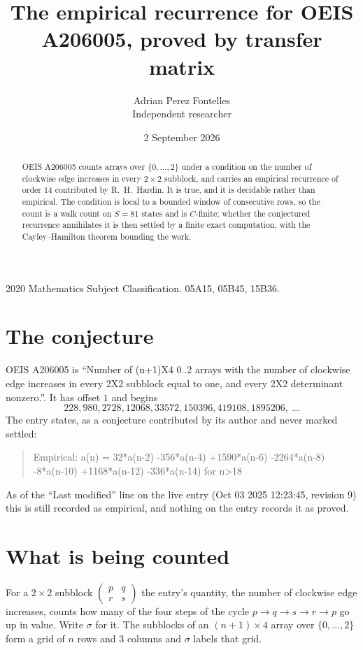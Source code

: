 \documentclass[11pt,a4paper]{article}
\title{The empirical recurrence for OEIS A206005, proved by transfer matrix}
\author{Adrian Perez Fontelles\\ \small Independent researcher}
\date{2 September 2026}
\theoremstyle{plain}
\theoremstyle{definition}
\begin{document}
\maketitle

\begin{abstract}
OEIS A206005 counts arrays over $\{0,\dots,2\}$ under a condition on the number of clockwise edge increases
in every $2\times2$ subblock, and carries an empirical recurrence of order $14$ contributed by
R.~H.~Hardin. It is true, and it is decidable rather than empirical. The condition is local to
a bounded window of consecutive rows, so the count is a walk count on $S=81$ states and is
$C$-finite; whether the conjectured recurrence annihilates it is then settled by a finite exact
computation, with the Cayley--Hamilton theorem bounding the work.
\end{abstract}

\noindent\small 2020 Mathematics Subject Classification. 05A15, 05B45, 15B36.\normalsize

\section{The conjecture}

OEIS A206005 is ``Number of (n+1)X4 0..2 arrays with the number of clockwise edge increases in every 2X2 subblock equal to one, and every 2X2 determinant nonzero.''. It has offset $1$ and begins
\[
228, 980, 2728, 12068, 33572, 150396, 419108, 1895206,\ \dots
\]
The entry states, as a conjecture contributed by its author and never marked settled:
\begin{quote}
Empirical: a(n) = 32*a(n-2) -356*a(n-4) +1590*a(n-6) -2264*a(n-8) -8*a(n-10) +1168*a(n-12) -336*a(n-14) for n>18
\end{quote}
As of the ``Last modified'' line on the live entry (Oct 03 2025 12:23:45, revision 9) this is still
recorded as empirical, and nothing on the entry records it as proved.

\section{What is being counted}

For a $2\times2$ subblock $\begin{pmatrix}p&q\\r&s\end{pmatrix}$ the
entry's quantity, the number of clockwise edge increases, counts how many of the four steps of the cycle $p\to q\to s\to r\to p$ go up in value. Write $\sigma$ for it. The subblocks of an
$(n+1)\times4$ array over $\{0,\dots,2\}$ form a grid of $n$ rows and $3$
columns and $\sigma$ labels that grid.
\end{document}
